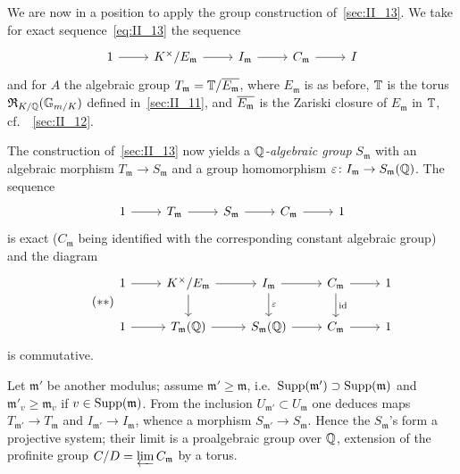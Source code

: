 We are now in a position to apply the group construction of~\ref{sec:II_13}.
We take for exact sequence~\eqref{eq:II_13} the sequence 
\[
	\begin{tikzcd}
		1 \arrow[r] & K^{\times} / E_\mathfrak{m} \arrow[r] & I_\mathfrak{m} 
		\arrow[r] & C_\mathfrak{m} \arrow[r] & I
	\end{tikzcd}
\]
and for $A$ the algebraic group $T_\mathfrak{m} = \mathbb{T} / \overline{E_\mathfrak{m}}$,%
where $E_\mathfrak{m}$ is as before, $\mathbb{T}$ is the torus $\operatorname{\mathfrak{R}}_{K/\mathbb{Q}}(
\mathbb{G}_{m/K})$ defined in~\ref{sec:II_11}, and $\overline{E_\mathfrak{m}}$ is the 
\dpage
Zariski closure of $E_\mathfrak{m}$ in $\mathbb{T}$, cf.\ ~\ref{sec:II_12}.

The construction of~\ref{sec:II_13} now yields a \emph{$\mathbb{Q}$-algebraic group} 
$S_\mathfrak{m}$ with an algebraic morphism $T_\mathfrak{m} \to S_\mathfrak{m}$ 
and a group homomorphism $\varepsilon\colon I_\mathfrak{m} \to S_\mathfrak{m}
(\mathbb{Q})$.
The sequence 
\[
\begin{tikzcd}
	1 \arrow[r] & T_\mathfrak{m} \arrow[r] & S_\mathfrak{m} \arrow[r] &
	C_\mathfrak{m} \arrow[r] & 1
\end{tikzcd}
\]
is exact ($C_\mathfrak{m}$ being identified with the corresponding constant 
algebraic group) and the diagram 
\begin{equation}\tag{$**$}\label{eq:II_22}
	\begin{tikzcd}
		1 \arrow[r] & K^\times / E_\mathfrak{m} \arrow[r] \arrow[d] & 
		I_\mathfrak{m} \arrow[r] \arrow[d, "\varepsilon"] & C_\mathfrak{m} 
		\arrow[r] \arrow[d, "\id"] & 1 \\
		1 \arrow[r] & T_\mathfrak{m}(\Q) \arrow[r] & S_\mathfrak{m}
		(\Q) \arrow[r] & C_\mathfrak{m} \arrow[r] & 1
	\end{tikzcd}
\end{equation}
is commutative.

\begin{obs}
Let $\mathfrak{m}'$ be another modulus; assume $\mathfrak{m}' \geq \mathfrak{m}
$, i.e.\ $\operatorname{Supp}(\mathfrak{m}') \supset \operatorname{Supp}(\mathfrak{m})$ and 
$\mathfrak{m}'_v \geq \mathfrak{m}_v$ if $v \in \operatorname{Supp}(\mathfrak{m})$. From the  
inclusion $U_{\mathfrak{m}'} \subset U_\mathfrak{m}$ one deduces maps $T_{
\mathfrak{m}'} \to T_\mathfrak{m}$ and $I_{\mathfrak{m}'} \to I_\mathfrak{m}$,
whence a morphism $S_{\mathfrak{m}'} \to S_\mathfrak{m}$. Hence the 
$S_\mathfrak{m}$'s form a projective system; their limit is a proalgebraic 
group over $\mathbb{Q}$, extension of the profinite group $C/D = \varprojlim
C_{\mathfrak{m}}$ by a torus.
\end{obs}

